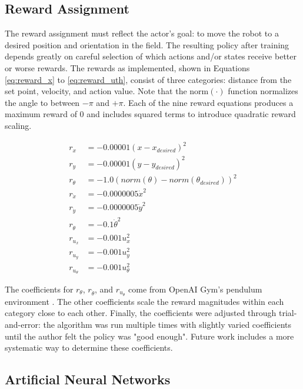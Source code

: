 \subsection{Reward Assignment}
The reward assignment must reflect the actor's goal: to move the robot to a desired position and orientation in the field. The resulting policy after training depends greatly on careful selection of which actions and/or states receive better or worse rewards. The rewards as implemented, shown in Equations \ref{eq:reward_x} to \ref{eq:reward_uth}, consist of three categories: distance from the set point, velocity, and action value. Note that the $\text{norm}(\cdot)$ function normalizes the angle to between $-\pi$ and $+\pi$. Each of the nine reward equations produces a maximum reward of 0 and includes squared terms to introduce quadratic reward scaling.

\begin{align}
r_x &= -0.00001 (x-x_{desired})^2 \label{eq:reward_x}\\
r_y &= -0.00001 (y-y_{desired})^2 \\
r_\theta &= -1.0 (norm(\theta)-norm(\theta_{desired}))^2 \\
r_{\dot{x}} &= -0.0000005 \dot{x}^2 \\
r_{\dot{y}} &= -0.0000005 \dot{y}^2 \\
r_{\dot{\theta}} &= -0.1 \dot{\theta}^2 \\
r_{u_x} &= -0.001u_x^2 \\
r_{u_y} &= -0.001u_y^2 \\
r_{u_\theta} &= -0.001u_\theta^2 \label{eq:reward_uth}
\end{align}

The coefficients for $r_\theta$, $r_{\dot{\theta}}$, and $r_{u_\theta}$ come from OpenAI Gym's pendulum environment \cite{openai_pendulum}. The other coefficients scale the reward magnitudes within each category close to each other. Finally, the coefficients were adjusted through trial-and-error: the algorithm was run multiple times with slightly varied coefficients until the author felt the policy was "good enough". Future work includes a more systematic way to determine these coefficients.

\subsection{Artificial Neural Networks}
